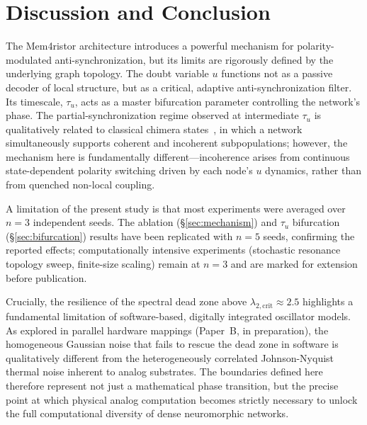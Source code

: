 \documentclass[11pt,a4paper]{article}
\begin{document}
\section{Discussion and Conclusion}
\label{sec:discussion}
The Mem4ristor architecture introduces a powerful mechanism for polarity-modulated anti-synchronization, but its limits are rigorously defined by the underlying graph topology. The doubt variable $u$ functions not as a passive decoder of local structure, but as a critical, adaptive anti-synchronization filter. Its timescale, $\tau_u$, acts as a master bifurcation parameter controlling the network's phase. The partial-synchronization regime observed at intermediate $\tau_u$ is qualitatively related to classical chimera states~\cite{abrams2004}, in which a network simultaneously supports coherent and incoherent subpopulations; however, the mechanism here is fundamentally different---incoherence arises from continuous state-dependent polarity switching driven by each node's $u$ dynamics, rather than from quenched non-local coupling.

A limitation of the present study is that most experiments were averaged over $n=3$ independent seeds. The ablation (\S\ref{sec:mechanism}) and $\tau_u$ bifurcation (\S\ref{sec:bifurcation}) results have been replicated with $n=5$ seeds, confirming the reported effects; computationally intensive experiments (stochastic resonance topology sweep, finite-size scaling) remain at $n=3$ and are marked for extension before publication.

Crucially, the resilience of the spectral dead zone above $\lambda_{2,\mathrm{crit}} \approx 2.5$ highlights a fundamental limitation of software-based, digitally integrated oscillator models. As explored in parallel hardware mappings (Paper~B, in preparation), the homogeneous Gaussian noise that fails to rescue the dead zone in software is qualitatively different from the heterogeneously correlated Johnson-Nyquist thermal noise inherent to analog substrates. The boundaries defined here therefore represent not just a mathematical phase transition, but the precise point at which physical analog computation becomes strictly necessary to unlock the full computational diversity of dense neuromorphic networks.
\end{document}
